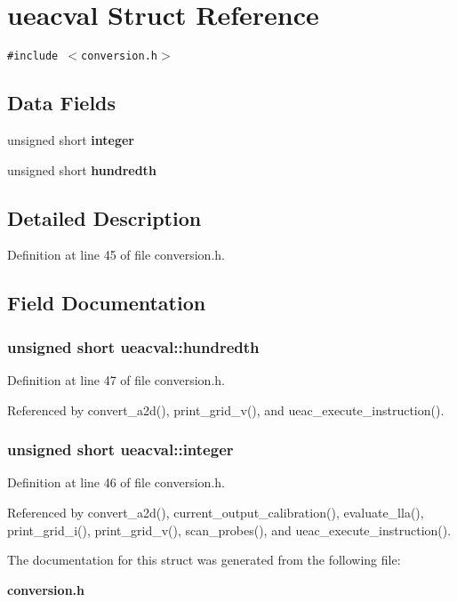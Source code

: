 \section{ueacval Struct Reference}
\label{structueacval}
{\tt \#include $<$conversion.h$>$}

\subsection*{Data Fields}
\begin{CompactItemize}
\item 
unsigned short {\bf integer}
\item 
unsigned short {\bf hundredth}
\end{CompactItemize}


\subsection{Detailed Description}




Definition at line 45 of file conversion.h.

\subsection{Field Documentation}
\subsubsection{\setlength{\rightskip}{0pt plus 5cm}unsigned short {\bf ueacval::hundredth}}\label{structueacval_o1}




Definition at line 47 of file conversion.h.

Referenced by convert\_\-a2d(), print\_\-grid\_\-v(), and ueac\_\-execute\_\-instruction().
\subsubsection{\setlength{\rightskip}{0pt plus 5cm}unsigned short {\bf ueacval::integer}}\label{structueacval_o0}




Definition at line 46 of file conversion.h.

Referenced by convert\_\-a2d(), current\_\-output\_\-calibration(), evaluate\_\-lla(), print\_\-grid\_\-i(), print\_\-grid\_\-v(), scan\_\-probes(), and ueac\_\-execute\_\-instruction().

The documentation for this struct was generated from the following file:\begin{CompactItemize}
\item 
{\bf conversion.h}\end{CompactItemize}
